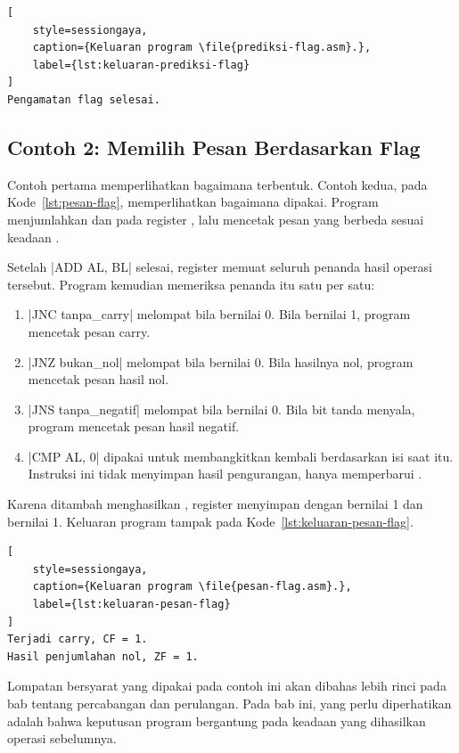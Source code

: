 \begin{lstlisting}[
    style=sessiongaya,
    caption={Keluaran program \file{prediksi-flag.asm}.},
    label={lst:keluaran-prediksi-flag}
]
Pengamatan flag selesai.
\end{lstlisting}

\subsection{Contoh 2: Memilih Pesan Berdasarkan Flag}

Contoh pertama memperlihatkan bagaimana  terbentuk.
Contoh kedua, pada Kode~\ref{lst:pesan-flag}, memperlihatkan
bagaimana  dipakai. Program menjumlahkan  dan
 pada register , lalu mencetak pesan yang berbeda
sesuai keadaan .



Setelah \lstasm|ADD AL, BL| selesai, register  memuat
seluruh penanda hasil operasi tersebut. Program kemudian memeriksa
penanda itu satu per satu:

\begin{enumerate}
    \item \lstasm|JNC tanpa_carry| melompat bila  bernilai
          0. Bila  bernilai 1, program mencetak pesan
          carry.
    \item \lstasm|JNZ bukan_nol| melompat bila  bernilai 0.
          Bila hasilnya nol, program mencetak pesan hasil nol.
    \item \lstasm|JNS tanpa_negatif| melompat bila  bernilai
          0. Bila bit tanda menyala, program mencetak pesan hasil
          negatif.
    \item \lstasm|CMP AL, 0| dipakai untuk membangkitkan kembali
           berdasarkan isi  saat itu. Instruksi ini
          tidak menyimpan hasil pengurangan, hanya memperbarui
          .
\end{enumerate}

Karena  ditambah  menghasilkan , register
 menyimpan  dengan  bernilai 1 dan
 bernilai 1. Keluaran program tampak pada
Kode~\ref{lst:keluaran-pesan-flag}.

\begin{lstlisting}[
    style=sessiongaya,
    caption={Keluaran program \file{pesan-flag.asm}.},
    label={lst:keluaran-pesan-flag}
]
Terjadi carry, CF = 1.
Hasil penjumlahan nol, ZF = 1.
\end{lstlisting}

Lompatan bersyarat yang dipakai pada contoh ini akan dibahas lebih
rinci pada bab tentang percabangan dan perulangan. Pada bab ini,
yang perlu diperhatikan adalah bahwa keputusan program bergantung
pada keadaan  yang dihasilkan operasi sebelumnya.
